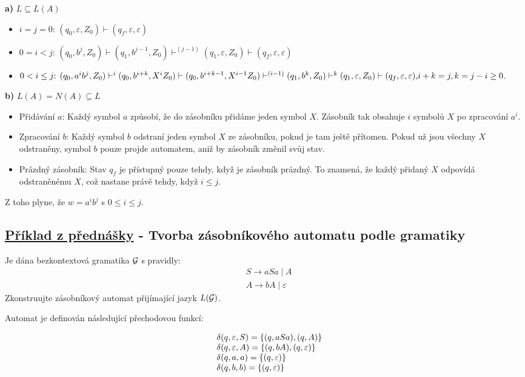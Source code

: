 \textbf{a)} $L \subseteq L(A)$
\begin{itemize}[leftmargin=*]
    \item $i=j=0 \text{: } (q_0, \varepsilon, Z_0) \vdash (q_f, \varepsilon, \varepsilon)$
    \item $0=i < j \text{: } (q_0, b^j, Z_0) \vdash (q_1, b^{j-1}, Z_0) \vdash^{(j-1)} (q_1, \varepsilon, Z_0) 
    \vdash (q_f, \varepsilon, \varepsilon)$
    \item ${0<i \leq j \text{: } (q_0, a^i b^j, Z_0) \vdash^i (q_0, b^{i+k}, X^i Z_0) \vdash (q_0, b^{i+k-1}, X^{i-1} Z_0)
    \vdash^{(i-1)} (q_1, b^k, Z_0) \vdash^k (q_1, \varepsilon, Z_0) \vdash (q_f, \varepsilon, \varepsilon),}\\
    i+k = j, k=j-i \geq 0$.
\end{itemize}
\textbf{b)} $L(A) = N(A) \subseteq L$
\begin{itemize}[leftmargin=*,noitemsep]
    \item Přidávání $a$:
    Každý symbol $a$ způsobí, že do zásobníku přidáme jeden symbol $X$. Zásobník tak obsahuje $i$ symbolů $X$ po 
    zpracování $a^i$.
    \item Zpracování $b$:
    Každý symbol $b$ odstraní jeden symbol $X$ ze zásobníku, pokud je tam ještě přítomen. Pokud už jsou všechny $X$ 
    odstraněny, symbol $b$ pouze projde automatem, aniž by zásobník změnil svůj stav.
    \item Prázdný zásobník:
    Stav $q_f$ je přístupný pouze tehdy, když je zásobník prázdný. To znamená, že každý přidaný $X$ odpovídá 
    odstraněnému $X$, což nastane právě tehdy, když $i \leq j$.
\end{itemize}
Z toho plyne, že $w = a^i b^j$ s $0 \leq i \leq j$.

\subsection{\href{https://youtu.be/9zpbNd1Yqnc?list=PLQL6z4JeTTQkLuzI78OTnfYBclE1g0UjS&t=1621}{Příklad z přednášky} - Tvorba zásobníkového automatu podle gramatiky} 
Je dána bezkontextová gramatika $\mathcal{G}$ s pravidly:
\begin{align*}
    &S \rightarrow aSa \mid A \\
    &A \rightarrow bA \mid \varepsilon
\end{align*}
Zkonstruujte zásobníkový automat přijímající jazyk $L(\mathcal{G})$.

Automat je definován následující přechodovou funkcí: 

\[
\begin{array}{l l}
    & \delta(q, \varepsilon, S) = \left\lbrace (q, aSa), (q, A) \right\rbrace \\
    & \delta(q, \varepsilon, A) = \left\lbrace (q, bA), (q, \varepsilon) \right\rbrace \\
    & \delta(q, a, a) = \left\lbrace (q, \varepsilon) \right\rbrace \\
    & \delta(q, b, b) = \left\lbrace (q, \varepsilon) \right\rbrace \\ 
\end{array}
\]

